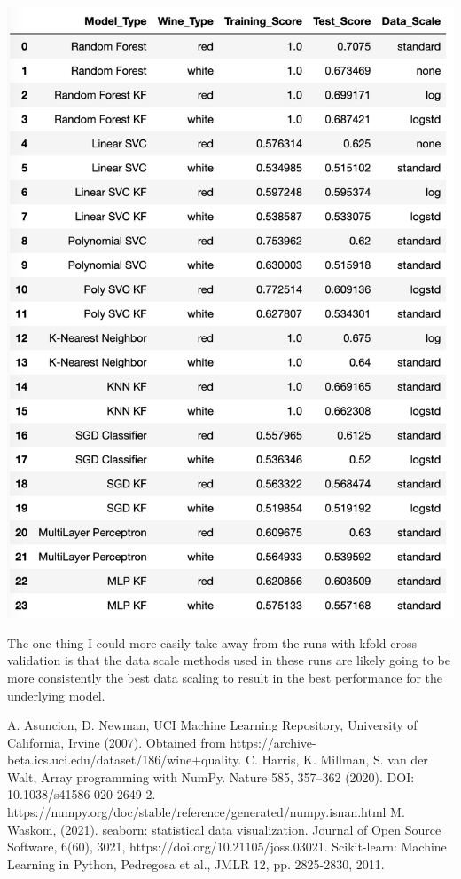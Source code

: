 \documentclass[titlepage]{article}
\begin{document}
\begin{center}
	\includegraphics[width=.8\textwidth]{img/kfoldresults.png}	
\end{center}
	
The one thing I could more easily take away from the runs with kfold cross validation is that the data scale methods used in these runs are likely going to be more consistently the best data scaling to result in the best performance for the underlying model.  

\begin{thebibliography}{9}
	 A. Asuncion, D. Newman, UCI Machine Learning Repository, University of California, Irvine  (2007).  Obtained from https://archive-beta.ics.uci.edu/dataset/186/wine+quality. 
	 C. Harris, K. Millman, S. van der Walt,  Array programming with NumPy. Nature 585, 357–362 (2020). DOI: 10.1038/s41586-020-2649-2.  https://numpy.org/doc/stable/reference/generated/numpy.isnan.html
	 M. Waskom, (2021). seaborn: statistical data visualization. Journal of Open Source Software, 6(60), 3021, https://doi.org/10.21105/joss.03021.
	Scikit-learn: Machine Learning in Python, Pedregosa et al., JMLR 12, pp. 2825-2830, 2011. 
\end{thebibliography}
\end{document}
